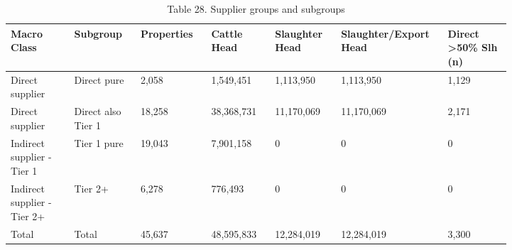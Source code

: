 \documentclass[12pt]{article}
\begin{document}
\begin{table}[H]
\centering
\caption{Table 28. Supplier groups and subgroups}
{\fontsize{12}{14}\selectfont
\setlength{\tabcolsep}{3pt}
\renewcommand{\arraystretch}{1.08}
\begin{tabular}{p{0.117\linewidth}p{0.117\linewidth}p{0.117\linewidth}p{0.117\linewidth}p{0.117\linewidth}p{0.117\linewidth}p{0.117\linewidth}}
\toprule
Macro Class & Subgroup & Properties & Cattle Head & Slaughter Head & Slaughter/Export Head & Direct >50\% Slh (n) \\
\midrule
Direct supplier & Direct pure & 2,058 & 1,549,451 & 1,113,950 & 1,113,950 & 1,129 \\
Direct supplier & Direct also Tier 1 & 18,258 & 38,368,731 & 11,170,069 & 11,170,069 & 2,171 \\
Indirect supplier - Tier 1 & Tier 1 pure & 19,043 & 7,901,158 & 0 & 0 & 0 \\
Indirect supplier - Tier 2+ & Tier 2+ & 6,278 & 776,493 & 0 & 0 & 0 \\
Total & Total & 45,637 & 48,595,833 & 12,284,019 & 12,284,019 & 3,300 \\
\bottomrule
\end{tabular}
}
\end{table}
\end{document}
